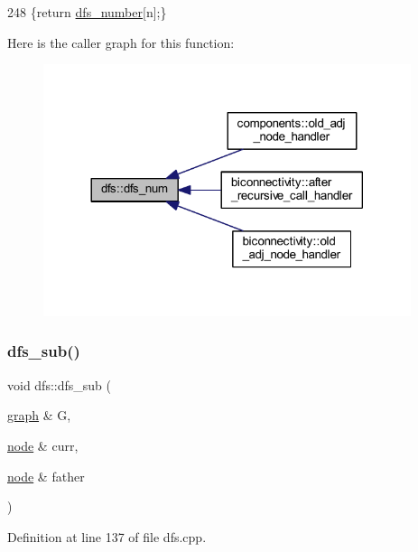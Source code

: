 \begin{DoxyCode}
248     \{\textcolor{keywordflow}{return} \mbox{\hyperlink{classdfs_a99727f2274d6af63daae4f0518f3adbe}{dfs\_number}}[n];\}
\end{DoxyCode}
Here is the caller graph for this function\+:
\nopagebreak
\begin{figure}[H]
\begin{center}
\leavevmode
\includegraphics[width=305pt]{classdfs_a315f16831a0bd333960e87e045cb37c8_icgraph}
\end{center}
\end{figure}
\mbox{\label{classdfs_ad10b710339b289a61723aef52fbcb5b4}} 
\subsubsection{\texorpdfstring{dfs\+\_\+sub()}{dfs\_sub()}}
{\footnotesize\ttfamily void dfs\+::dfs\+\_\+sub (\begin{DoxyParamCaption}\item[{\mbox{\hyperlink{classgraph}{graph}} \&}]{G,  }\item[{\mbox{\hyperlink{classnode}{node}} \&}]{curr,  }\item[{\mbox{\hyperlink{classnode}{node}} \&}]{father }\end{DoxyParamCaption})\hspace{0.3cm}{\ttfamily [private]}}



Definition at line 137 of file dfs.\+cpp.


